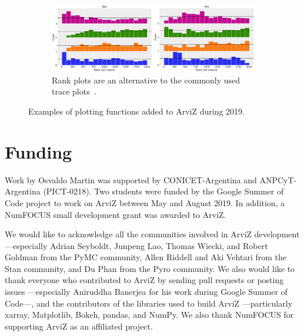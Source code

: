 \documentclass[anonymous=false, %
               format=acmsmall, %
               review=true, %
               screen=true, %
               nonacm=true]{acmart}
\begin{document}
\begin{figure}[!htb]
  \begin{subfigure}{0.98\textwidth}
  \centering
    \includegraphics[width=\linewidth]{plot_rank.png}
    \caption{Rank plots are an alternative to the commonly used trace
      plots~\cite{vehtari2019rank}.}\label{fig:n2}
  \end{subfigure}
  \caption{Examples of plotting functions added to ArviZ during
  2019.}\label{fig:examples}
\end{figure}

\section*{Funding}
Work by Osvaldo Martin was supported by CONICET-Argentina and ANPCyT-Argentina
(PICT-0218). Two students were funded by the Google Summer of Code project to
work on ArviZ between May and August 2019. In addition, a NumFOCUS small
development grant was awarded to ArviZ.

\begin{acks}
  We would like to acknowledge all the communities involved in ArviZ
  development ---especially Adrian Seyboldt, Junpeng Lao,
  Thomas Wiecki, and Robert Goldman from the PyMC community, Allen Riddell and
  Aki Vehtari from the Stan community, and Du Phan from the Pyro community.
  We also would like to thank everyone who contributed to ArviZ by sending pull
  requests or posting issues ---especially Aniruddha Banerjea for his work
  during Google Summer of Code---, and the contributors of the libraries used to
  build ArviZ ---particularly xarray, Matplotlib, Bokeh, pandas, and NumPy. We
  also thank NumFOCUS for supporting ArviZ as an affiliated project.
\end{acks}




\end{document}
